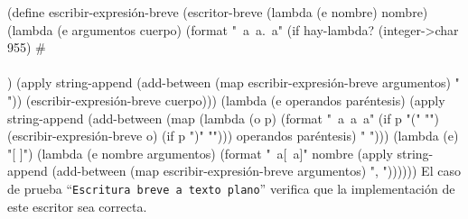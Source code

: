 \documentclass[10pt,oneside,openany,letterpaper]{book}
\begin{document}
\nwenddocs{}\plusendmoddef
(define escribir-expresión-breve
  (escritor-breve
   (lambda (e nombre) nombre)
   (lambda (e argumentos cuerpo)
     (format "~a~a.~a"
             (if hay-lambda? (integer->char 955) #\\\\)
             (apply string-append
                    (add-between (map escribir-expresión-breve argumentos)
                                 " "))
             (escribir-expresión-breve cuerpo)))
   (lambda (e operandos paréntesis)
     (apply string-append
            (add-between (map (lambda (o p)
                                (format "~a~a~a"
                                        (if p "(" "")
                                        (escribir-expresión-breve o)
                                        (if p ")" "")))
                              operandos paréntesis)
                         " ")))
   (lambda (e) "[ ]")
   (lambda (e nombre argumentos)
     (format "~a[~a]" nombre
             (apply string-append
                    (add-between (map escribir-expresión-breve argumentos)
                                 ", "))))))
\eatline
{}\nwendcode{}\nwdocspar
El caso de prueba ``{\tt{}Escritura\ breve\ a\ texto\ plano}'' verifica que la implementación de este escritor sea correcta.
\end{document}
